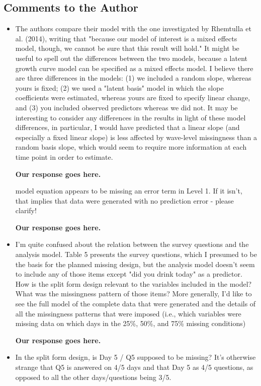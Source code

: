 \documentclass[letterpaper,12pt]{article}
\begin{document}
\subsection{Comments to the Author}
\begin{itemize}
\item  The authors compare their model with the one investigated by Rhemtulla et al. (2014), writing that "because our model of interest is a mixed effects model, though, we cannot be sure that this result will hold." It might be useful to spell out the differences between the two models, because a latent growth curve model can be specified as a mixed effects model. I believe there are three differences in the models: (1) we included a random slope, whereas yours is fixed; (2) we used a "latent basis" model in which the slope coefficients were estimated, whereas yours are fixed to specify linear change, and (3) you included observed predictors whereas we did not. It may be interesting to consider any differences in the results in light of these model differences, in particular, I would have predicted that a linear slope (and especially a fixed linear slope) is less affected by wave-level missingness than a random basis slope, which would seem to require more information at each time point in order to estimate.

{\bf Our response goes here.}

\itemThe model equation appears to be missing an error term in Level 1. If it isn't, that implies that data were generated with no prediction error - please clarify!

{\bf Our response goes here.}

\item I'm quite confused about the relation between the survey questions and the analysis model. Table 5 presents the survey questions, which I presumed to be the basis for the planned missing design, but the analysis model doesn't seem to include any of those items except "did you drink today" as a predictor. How is the split form design relevant to the variables included in the model? What was the missingness pattern of those items? More generally, I'd like to see the full model of the complete data that were generated and the details of all the missingness patterns that were imposed (i.e., which variables were missing data on which days in the 25\%, 50\%, and 75\% missing conditions)

{\bf Our response goes here.}

\item In the split form design, is Day 5 / Q5 supposed to be missing? It's otherwise strange that Q5 is answered on 4/5 days and that Day 5 as 4/5 questions, as opposed to all the other days/questions being 3/5.


\end{itemize}
\end{document}
